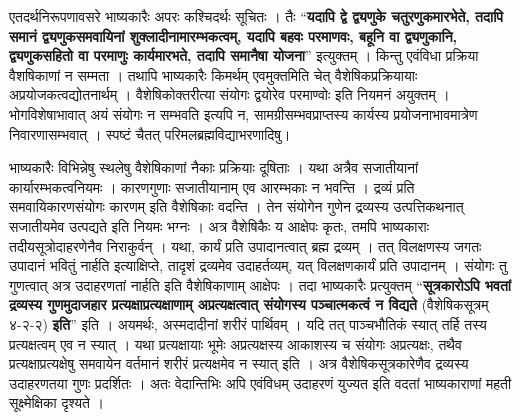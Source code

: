 {एतदर्थनिरूपणावसरे भाष्यकारैः अपरः कश्चिदर्थः सूचितः । तैः “\textbf{यदापि द्वे द्व्यणुके चतुरणुकमारभेते, तदापि समानं द्व्यणुकसमवायिनां शुक्लादीनामारम्भकत्वम्, यदापि बहवः परमाणवः, बहूनि वा द्व्यणुकानि, द्व्यणुकसहितो वा परमाणुः कार्यमारभते, तदापि समानैषा योजना}” इत्युक्तम् । किन्तु एवंविधा प्रक्रिया वैशषिकाणां न सम्मता । तथापि भाष्यकारैः किमर्थम् एवमुक्तमिति चेत् वैशेषिकप्रक्रियायाः अप्रयोजकत्वद्योतनार्थम् । वैशेषिकोक्तरीत्या संयोगः द्वयोरेव परमाण्वोः इति नियमनं अयुक्तम् । भोगविशेषाभावात् अयं संयोगः न सम्भवति इत्यपि न, सामग्रीसम्भवप्राप्तस्य कार्यस्य प्रयोजनाभावमात्रेण निवारणासम्भवात् । स्पष्टं चैतत् परिमलब्रह्मविद्याभरणादिषु।

भाष्यकारैः विभिन्नेषु स्थलेषु वैशेषिकाणां नैकाः प्रक्रियाः दूषिताः । यथा अत्रैव सजातीयानां कार्यारम्भकत्वनियमः । कारणगुणाः सजातीयानाम् एव आरम्भकाः न भवन्ति । द्रव्यं प्रति समवायिकारणसंयोगः कारणम् इति वैशेषिकाः वदन्ति । तेन संयोगेन गुणेन द्रव्यस्य उत्पत्तिकथनात् सजातीयमेव उत्पद्यते इति नियमः भग्नः । अत्र वैशेषिकैः य आक्षेपः कृतः, तमपि भाष्यकाराः तदीयसूत्रोदाहरणेनैव निराकुर्वन् । यथा, कार्यं प्रति उपादानत्वात् ब्रह्म द्रव्यम् । तत् विलक्षणस्य जगतः उपादानं भवितुं नार्हति इत्याक्षिप्ते, तादृशं द्रव्यमेव उदाहर्तव्यम्, यत् विलक्षणकार्यं प्रति उपादानम् । संयोगः तु गुणत्वात् अत्र उदाहरणतां नार्हति इति वैशेषिकाणाम् आक्षेपः । तदा भाष्यकारैः प्रत्युक्तम् “\textbf{सूत्रकारोऽपि भवतां द्रव्यस्य गुणमुदाजहार प्रत्यक्षाप्रत्यक्षाणाम् अप्रत्यक्षत्वात् संयोगस्य पञ्चात्मकत्वं न विद्यते} (वैशेषिकसूत्रम् ४-२-२) \textbf{इति}” इति । अयमर्थः, अस्मदादीनां शरीरं पार्थिवम् । यदि तत् पाञ्चभौतिकं स्यात् तर्हि तस्य प्रत्यक्षत्वम् एव न स्यात् । यथा प्रत्यक्षायाः भूमेः अप्रत्यक्षस्य आकाशस्य च संयोगः अप्रत्यक्षः, तथैव प्रत्यक्षाप्रत्यक्षेषु समवायेन वर्तमानं शरीरं प्रत्यक्षमेव न स्यात् इति । अत्र वैशेषिकसूत्रकारेणैव द्रव्यस्य उदाहरणतया गुणः प्रदर्शितः । अतः वेदान्तिभिः अपि एवंविधम् उदाहरणं युज्यत इति वदतां भाष्यकाराणां महती सूक्ष्मेक्षिका दृश्यते ।

}
